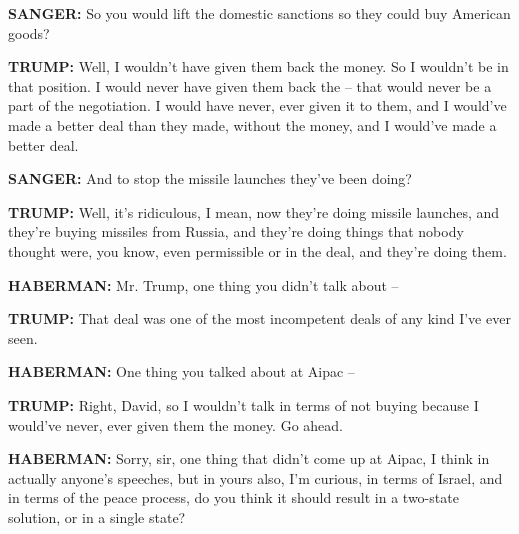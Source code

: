 \textbf{SANGER:} So you would lift the domestic sanctions so they could
buy American goods?

\textbf{TRUMP:} Well, I wouldn't have given them back the money. So I
wouldn't be in that position. I would never have given them back the --
that would never be a part of the negotiation. I would have never, ever
given it to them, and I would've made a better deal than they made,
without the money, and I would've made a better deal.

\textbf{SANGER:} And to stop the missile launches they've been doing?

\textbf{TRUMP:} Well, it's ridiculous, I mean, now they're doing missile
launches, and they're buying missiles from Russia, and they're doing
things that nobody thought were, you know, even permissible or in the
deal, and they're doing them.

\textbf{HABERMAN:} Mr. Trump, one thing you didn't talk about --

\textbf{TRUMP:} That deal was one of the most incompetent deals of any
kind I've ever seen.

\textbf{HABERMAN:} One thing you talked about at Aipac --

\textbf{TRUMP:} Right, David, so I wouldn't talk in terms of not buying
because I would've never, ever given them the money. Go ahead.

\textbf{HABERMAN:} Sorry, sir, one thing that didn't come up at Aipac, I
think in actually anyone's speeches, but in yours also, I'm curious, in
terms of Israel, and in terms of the peace process, do you think it
should result in a two-state solution, or in a single state?

